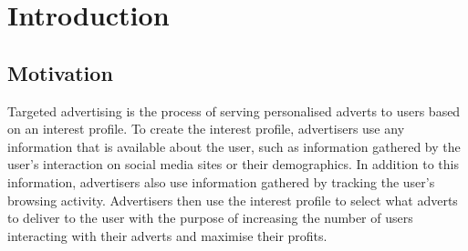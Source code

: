\documentclass{l4proj}
\begin{document}
%
%
%
%
%
%
%
%
\chapter{Introduction}


\section{Motivation}
Targeted advertising is the process of serving personalised adverts to users based on an interest profile. To create the interest profile, advertisers use any information that is available about the user, such as information gathered by the user's interaction on social media sites or their demographics. In addition to this information, advertisers also use information gathered by tracking the user’s
browsing activity. Advertisers then use the interest profile to select what adverts to deliver to the user with the purpose of increasing the number of users interacting with their adverts and maximise their profits. 
\end{document}
